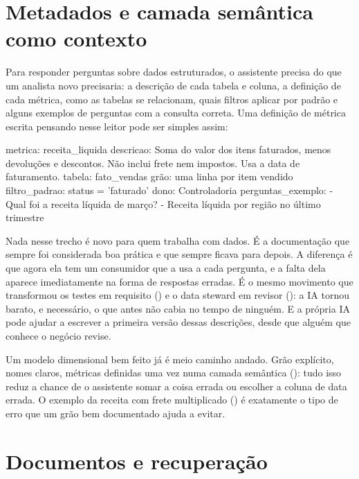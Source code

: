 \section{Metadados e camada semântica como contexto}
\label{sec:metadados-contexto}

Para responder perguntas sobre dados estruturados, o assistente precisa do que um analista
novo precisaria: a descrição de cada tabela e coluna, a definição de cada métrica, como as
tabelas se relacionam, quais filtros aplicar por padrão e alguns exemplos de perguntas com a
consulta correta. Uma definição de métrica escrita pensando nesse leitor pode ser simples
assim:

\begin{terminal}
metrica: receita_liquida
descricao: Soma do valor dos itens faturados, menos devoluções e descontos.
  Não inclui frete nem impostos. Usa a data de faturamento.
tabela: fato_vendas
grão: uma linha por item vendido
filtro_padrao: status = 'faturado'
dono: Controladoria
perguntas_exemplo:
  - Qual foi a receita líquida de março?
  - Receita líquida por região no último trimestre
\end{terminal}

Nada nesse trecho é novo para quem trabalha com dados. É a documentação que sempre foi
considerada boa prática e que sempre ficava para depois. A diferença é que agora ela tem um
consumidor que a usa a cada pergunta, e a falta dela aparece imediatamente na forma de
respostas erradas. É o mesmo movimento que transformou os testes em requisito
() e o data steward em revisor (): a IA tornou barato,
e necessário, o que antes não cabia no tempo de ninguém. E a própria IA pode ajudar a
escrever a primeira versão dessas descrições, desde que alguém que conhece o negócio revise.

Um modelo dimensional bem feito já é meio caminho andado. Grão explícito, nomes claros,
métricas definidas uma vez numa camada semântica (): tudo isso
reduz a chance de o assistente somar a coisa errada ou escolher a coluna de data errada. O
exemplo da receita com frete multiplicado () é exatamente o tipo
de erro que um grão bem documentado ajuda a evitar.

\section{Documentos e recuperação}
\label{sec:documentos-recuperacao}

